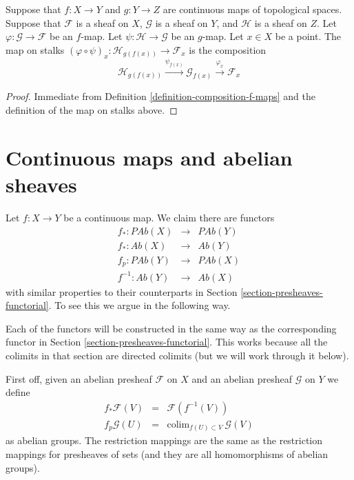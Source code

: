 \begin{lemma}
\label{lemma-compose-f-maps-stalks}
Suppose that $f : X \to Y$ and $g : Y \to Z$ are continuous
maps of topological spaces. Suppose that $\mathcal{F}$ is
a sheaf on $X$, $\mathcal{G}$ is a sheaf on $Y$, and
$\mathcal{H}$ is a sheaf on $Z$.
Let $\varphi : \mathcal{G} \to \mathcal{F}$ be an $f$-map.
Let $\psi : \mathcal{H} \to \mathcal{G}$ be an $g$-map.
Let $x \in X$ be a point. The map on stalks
$(\varphi \circ \psi)_x : \mathcal{H}_{g(f(x))}
\to \mathcal{F}_x$ is the composition
$$
\mathcal{H}_{g(f(x))}
\xrightarrow{\psi_{f(x)}}
\mathcal{G}_{f(x)}
\xrightarrow{\varphi_x}
\mathcal{F}_x
$$
\end{lemma}

\begin{proof}
Immediate from Definition \ref{definition-composition-f-maps}
and the definition of the map on stalks above.
\end{proof}



\section{Continuous maps and abelian sheaves}
\label{section-abelian-presheaves-functorial}

\noindent
Let $f : X \to Y$ be a continuous map.
We claim there are functors
\begin{eqnarray*}
f_* : \textit{PAb}(X) & \longrightarrow & \textit{PAb}(Y) \\
f_* : \textit{Ab}(X) & \longrightarrow & \textit{Ab}(Y) \\
f_p : \textit{PAb}(Y) & \longrightarrow & \textit{PAb}(X) \\
f^{-1} : \textit{Ab}(Y) & \longrightarrow & \textit{Ab}(X)
\end{eqnarray*}
with similar properties to their counterparts in 
Section \ref{section-presheaves-functorial}.
To see this we argue in the following way.

\medskip\noindent
Each of the functors will be constructed in the same
way as the corresponding functor in
Section \ref{section-presheaves-functorial}.
This works because all the colimits in that section
are directed colimits (but we will work through it below).

\medskip\noindent
First off, given an abelian presheaf $\mathcal{F}$ on $X$ and
an abelian presheaf $\mathcal{G}$ on $Y$ we define
\begin{eqnarray*}
f_*\mathcal{F}(V) & = & \mathcal{F}(f^{-1}(V)) \\
f_p\mathcal{G}(U) & = & \text{colim}_{f(U) \subset V}\ \mathcal{G}(V)
\end{eqnarray*}
as abelian groups. The restriction mappings are the same as 
the restriction mappings for presheaves of sets (and they are
all homomorphisms of abelian groups).

